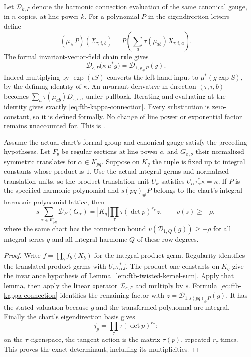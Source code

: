 Let \(\mathcal D_{k,P}\) denote the harmonic connection evaluation of
the same canonical gauge, in \(n\) copies, at line power \(k\).
For a polynomial \(P\) in the eigendirection letters define
\[
 (\mu_\#P)(X_{\tau,i,b})
       =P\left(\sum_a\tau(\mu_{ab})X_{\tau,i,a}\right).
\]
The formal invariant-vector-field chain rule gives
\begin{equation}\label{eq:ftb-kappa-connection}
 \mathcal D_{c,P}\bigl(\kappa\,\mu^*g\bigr)
                    =\mathcal D_{1,\mu_\#P}(g).
\end{equation}
Indeed multiplying by \(\exp(cS)\) converts the left-hand input to
\(\mu^*(g\exp S)\), by the defining identity of \(\kappa\).
An invariant derivative in direction \((\tau,i,b)\) becomes
\(\sum_a\tau(\mu_{ab})D_{\tau,i,a}\) under pullback.
Iterating and evaluating at the identity gives exactly
\eqref{eq:ftb-kappa-connection}.
Every substitution is zero-constant, so it is defined formally.
No change of line power or exponential factor remains unaccounted
for.  This is
.

\begin{srproposition}
\label{prop:ftb-harmonic-kernel-trace}
Assume the actual chart's formal group and canonical gauge satisfy the
preceding hypotheses.
Let \(F_b\) be regular sections at line power \(c\), and \(G_{\alpha,b}\)
their normalized symmetric translates for \(\alpha\in K_{pq}\).
Suppose on \(K_q\) the tuple is fixed up to integral constants whose
product is \(1\).
Use the actual integral germs and normalized translation units, so
the product translation unit \(U_\alpha\) satisfies
\(U_\alpha\tau_\alpha^*\kappa=\kappa\).
If \(P\) is the specified harmonic polynomial and
\(s(pq)_\#P\) belongs to the chart's integral harmonic polynomial
lattice, then
\[
 s\sum_{\alpha\in K_{pq}}\mathcal D_P(G_\alpha)
           =|K_q|\prod_\tau\tau(\det p)^{r_\tau}\,z,\qquad
                              v(z)\ge-\rho ,
\]
where the same chart has the connection bound
\(v(\mathcal D_{1,Q}(g))\ge-\rho\) for all integral series \(g\)
and all integral harmonic \(Q\) of these row degrees.
\end{srproposition}
\begin{proof}
Write \(f=\prod_b f_b(X_b)\) for the integral product germ.
Regularity identifies the translated product germs with
\(U_\alpha\tau_\alpha^*f\).
The product-one constants on \(K_q\) give the invariance hypothesis of
Lemma~\ref{lem:ftb-twisted-kernel-sum}.
Apply that lemma, then apply the linear operator
\(\mathcal D_{c,P}\) and multiply by \(s\).
Formula~\eqref{eq:ftb-kappa-connection} identifies the remaining factor
with
\(z=\mathcal D_{1,s(pq)_\#P}(g)\).
It has the stated valuation because \(g\) and the transformed
polynomial are integral.
Finally the chart's eigendirection basis gives
\[
                  j_p=\prod_\tau\tau(\det p)^{r_\tau} :
\]
on the \(\tau\)-eigenspace, the tangent action is the matrix
\(\tau(p)\), repeated \(r_\tau\) times.
This proves the exact determinant, including its multiplicities.
\end{proof}

